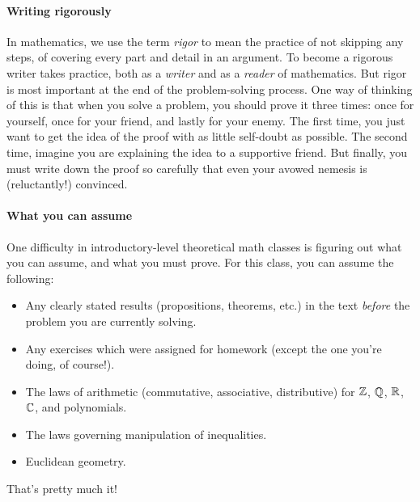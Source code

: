 \documentclass{tufte-book}
\begin{document}
\paragraph{Writing rigorously}
\label{sec:writing-rigorously}

In mathematics, we use the term \emph{rigor} to mean the practice of not skipping any steps, of covering every part and detail in an argument. To become a rigorous writer takes practice, both as a \emph{writer} and as a \emph{reader} of mathematics. But rigor is most important at the end of the problem-solving process. One way of thinking of this is that when you solve a problem, you should prove it three times: once for yourself, once for your friend, and lastly for your enemy. The first time, you just want to get the idea of the proof with as little self-doubt as possible. The second time, imagine you are explaining the idea to a supportive friend. But finally, you must write down the proof so carefully that even your avowed nemesis is (reluctantly!) convinced.

\paragraph{What you can assume}
\label{sec:what-you-can}

One difficulty in introductory-level theoretical math classes is figuring out what you can assume, and what you must prove. %
For this class, you can assume the following:
\begin{itemize}
    \item Any clearly stated results (propositions, theorems, etc.) in the text \emph{before} the problem you are currently solving.
    \item Any exercises which were assigned for homework (except the one you're doing, of course!).
    \item The laws of arithmetic (commutative, associative, distributive) for $\mathbb{Z}$, $\mathbb{Q}$, $\mathbb{R}$, $\mathbb{C}$, and polynomials.
    \item The laws governing manipulation of inequalities.
    \item Euclidean geometry.
\end{itemize}
That's pretty much it!






\end{document}
